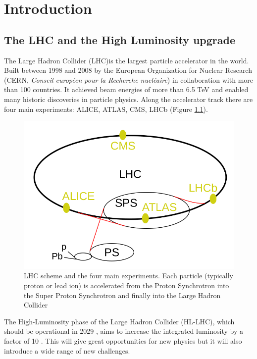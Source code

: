 
\chapter{Introduction}

\section{The LHC and the High Luminosity upgrade}

The Large Hadron Collider (LHC)is the largest particle accelerator in the world. Built between 1998 and 2008 by the European Organization for Nuclear Research (CERN, \textit{Conseil européen pour la Recherche nucléaire}) in collaboration with more than 100 countries. 
It achieved beam energies of more than 6.5 TeV and enabled many historic discoveries in particle physics.
Along the accelerator track there are four main experiments: ALICE, ATLAS, CMS, LHCb (Figure \ref{fig:LHC}). 

\begin{figure}[!h]
    \centering
    \includegraphics[width=.8\textwidth]{Images/intro/LHC.png}
    \caption{LHC scheme and the four main experiments. Each particle (typically proton or lead ion) is accelerated from the Proton Synchrotron into the Super Proton Synchrotron and finally into the Large Hadron Collider}
    \label{fig:LHC}
\end{figure}


The High-Luminosity phase of the Large Hadron Collider (HL-LHC), which should be operational in 2029 \cite{LS3_schedule_change}, aims to increase the integrated luminosity by a factor of 10 \cite{CERN-LHCC-2020-007}.
This will give great opportunities for new physics but it will also introduce a wide range of new challenges.

